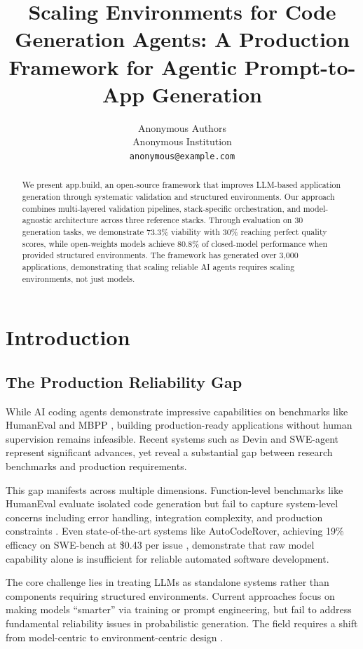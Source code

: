 \documentclass{article}
\title{Scaling Environments for Code Generation Agents: A Production Framework for Agentic Prompt-to-App Generation}
\author{%
  Anonymous Authors \\
  Anonymous Institution \\
  \texttt{anonymous@example.com} \\
}
\begin{document}
\maketitle

\begin{abstract}
We present app.build, an open-source framework that improves LLM-based application generation through systematic validation and structured environments. Our approach combines multi-layered validation pipelines, stack-specific orchestration, and model-agnostic architecture across three reference stacks. Through evaluation on 30 generation tasks, we demonstrate 73.3\% viability with 30\% reaching perfect quality scores, while open-weights models achieve 80.8\% of closed-model performance when provided structured environments. The framework has generated over 3,000 applications, demonstrating that scaling reliable AI agents requires scaling environments, not just models.
\end{abstract}

\section{Introduction}
\label{sec:intro}

\subsection{The Production Reliability Gap}

While AI coding agents demonstrate impressive capabilities on benchmarks like HumanEval \citep{chen2021evaluating} and MBPP \citep{austin2021program}, building production-ready applications without human supervision remains infeasible. Recent systems such as Devin \citep{cognition2024swe} and SWE-agent \citep{yang2024swe} represent significant advances, yet reveal a substantial gap between research benchmarks and production requirements.

This gap manifests across multiple dimensions. Function-level benchmarks like HumanEval evaluate isolated code generation but fail to capture system-level concerns including error handling, integration complexity, and production constraints \citep{liu2023your}. Even state-of-the-art systems like AutoCodeRover, achieving 19\% efficacy on SWE-bench at \$0.43 per issue \citep{zhang2024autocoder}, demonstrate that raw model capability alone is insufficient for reliable automated software development.

The core challenge lies in treating LLMs as standalone systems rather than components requiring structured environments. Current approaches focus on making models ``smarter'' via training or prompt engineering, but fail to address fundamental reliability issues in probabilistic generation. The field requires a shift from model-centric to environment-centric design \citep{jiang2024survey,paul2024benchmarks}.
\end{document}
